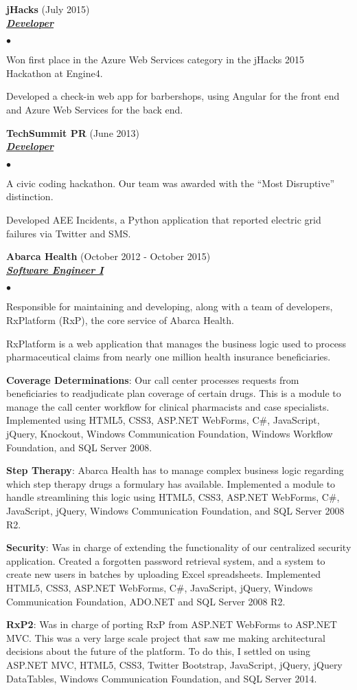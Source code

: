 \documentclass{article}
\newcommand{\employer}[3]{{ \textbf{#1} (#2)\\ \underline{\textbf{\emph{#3}}}\\  }}
\newenvironment{achievements}{\begin{list}{$\bullet$}{\topsep 0pt \itemsep -2pt}}{\vspace*{4pt}\end{list}}
\begin{document}
\employer{jHacks}{July 2015}{Developer}
	\begin{achievements}
	\item Won first place in the Azure Web Services category in the jHacks 2015 Hackathon at Engine4.
	\item Developed a check-in web app for barbershops, using Angular for the front end and Azure Web Services for the back end.
	\end{achievements}

\employer{TechSummit PR}{June 2013}{Developer}
	\begin{achievements}
	\item A civic coding hackathon. Our team was awarded with the ``Most Disruptive'' distinction.
	\item Developed AEE Incidents, a Python application that reported electric grid failures via Twitter and SMS.
	\end{achievements}

\employer{Abarca Health}{October 2012 - October 2015}{Software Engineer I}
	\begin{achievements}
	\item Responsible for maintaining and developing, along with a team of developers, RxPlatform (RxP), the core service of Abarca Health.
	\item RxPlatform is a web application that manages the business logic used to process pharmaceutical claims from nearly one million health insurance beneficiaries.
	\item \textbf{Coverage Determinations}: Our call center processes requests from beneficiaries to readjudicate plan coverage of certain drugs. This is a module to manage the call center workflow for clinical pharmacists and case specialists. Implemented using HTML5, CSS3, ASP.NET WebForms, C\string#, JavaScript, jQuery, Knockout, Windows Communication Foundation, Windows Workflow Foundation, and SQL Server 2008.
	\item \textbf{Step Therapy}: Abarca Health has to manage complex business logic regarding which step therapy drugs a formulary has available. Implemented a module to handle streamlining this logic using HTML5, CSS3, ASP.NET WebForms, C\string#, JavaScript, jQuery, Windows Communication Foundation, and SQL Server 2008 R2.
	\item \textbf{Security}: Was in charge of extending the functionality of our centralized security application. Created a forgotten password retrieval system, and a system to create new users in batches by uploading Excel spreadsheets. Implemented HTML5, CSS3, ASP.NET WebForms, C\string#, JavaScript, jQuery, Windows Communication Foundation, ADO.NET and SQL Server 2008 R2.
	\item \textbf{RxP2}: Was in charge of porting RxP from ASP.NET WebForms to ASP.NET MVC. This was a very large scale project that saw me making architectural decisions about the future of the platform. To do this, I settled on using ASP.NET MVC, HTML5, CSS3, Twitter Bootstrap, JavaScript, jQuery, jQuery DataTables, Windows Communication Foundation, and SQL Server 2014.
	\end{achievements}
\end{document}
